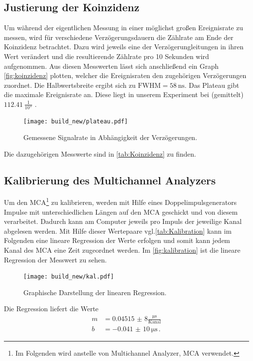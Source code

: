 \subsection{Justierung der Koinzidenz}
Um während der eigentlichen Messung in einer möglichst großen Ereignisrate zu messen, wird
für verschiedene Verzögerungsdauern die Zählrate am Ende der Koinzidenz betrachtet.
Dazu wird jeweils eine der Verzögerungleitungen in ihren Wert verändert und die resultierende Zählrate pro 10 Sekunden
wird aufgenommen.
Aus diesen Messwerten lässt sich anschließend ein Graph \autoref{fig:koinzidenz} plotten, 
welcher die Ereignisraten den zugehörigen Verzögerungen zuordnet.
Die Halbwertsbreite ergibt sich zu $\text{FWHM} = \SI{58}{\nano\second}$.
Das Plateau gibt die maximale Ereignisrate an. 
Diese liegt in unserem Experiment bei (gemittelt) $\SI{112,41}{\frac{1}{10 \second}}$ .
\begin{figure}
    \centering
    \texttt{[image: build\_new/plateau.pdf]}
    \caption{Gemessene Signalrate in Abhängigkeit der Verzögerungen.}
    \label{fig:koinzidenz}
\end{figure}
\FloatBarrier
Die dazugehörigen Messwerte sind in \autoref{tab:Koinzidenz} zu finden.
\FloatBarrier

\subsection{Kalibrierung des Multichannel Analyzers}
Um den MCA\footnote{Im Folgenden wird anstelle von Multichannel Analyzer, MCA verwendet.} zu kalibrieren, werden
mit Hilfe eines Doppelimpulsgenerators Impulse mit unterschiedlichen Längen auf den MCA geschickt und von diesem verarbeitet.
Dadurch kann am Computer jeweils pro Impuls der jeweilige Kanal abgelesen werden.
Mit Hilfe dieser Wertepaare vgl.\autoref{tab:Kalibration} kann im Folgenden eine lineare Regression der Werte erfolgen und somit 
kann jedem Kanal des MCA eine Zeit zugeordnet werden. 
Im \autoref{fig:kalibration} ist die lineare Regression der Messwert zu sehen.
\begin{figure}
    \centering
    \texttt{[image: build\_new/kal.pdf]}
    \caption{Graphische Darstellung der linearen Regression.}
    \label{fig:kalibration}
\end{figure}
\FloatBarrier
Die Regression liefert die Werte
\begin{equation}\label{eq:Regression}    
    \begin{split}
        m &= \num{0,04515(8)}\frac{\si{\micro\second}}{\text{Kanal}} \\
        b &= \SI{-0,041(10)}{\micro\second} \, .
    \end{split}
\end{equation}
